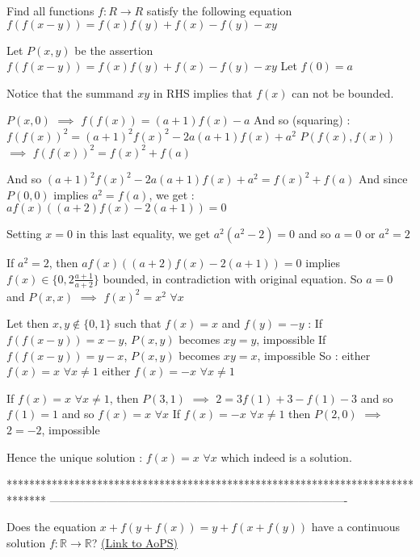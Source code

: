 \begin{solution}
	\begin{tcolorbox}Find all functions $f:R \to R$ satisfy the following equation
$f(f(x - y)) = f(x)f(y) + f(x) - f(y) - xy$\end{tcolorbox}
Let $P(x,y)$ be the assertion $f(f(x-y))=f(x)f(y)+f(x)-f(y)-xy$
Let $f(0)=a$

Notice that the summand $xy$ in RHS implies that $f(x)$ can not be bounded.

$P(x,0)$ $\implies$ $f(f(x))=(a+1)f(x)-a$
And so (squaring) : $f(f(x))^2=(a+1)^2f(x)^2-2a(a+1)f(x)+a^2$
$P(f(x),f(x))$ $\implies$ $f(f(x))^2=f(x)^2+f(a)$

And so $(a+1)^2f(x)^2-2a(a+1)f(x)+a^2=f(x)^2+f(a)$
And since $P(0,0)$ implies $a^2=f(a)$, we get : $af(x)((a+2)f(x)-2(a+1))=0$

Setting $x=0$ in this last equality, we get $a^2(a^2-2)=0$ and so $a=0$ or $a^2=2$

If $a^2=2$, then $af(x)((a+2)f(x)-2(a+1))=0$ implies $f(x)\in\{0,2\frac {a+1}{a+2}\}$ bounded, in contradiction with original equation.
So $a=0$ and $P(x,x)$ $\implies$ $f(x)^2=x^2$ $\forall x$

Let then $x,y\notin\{0,1\}$ such that $f(x)=x$ and $f(y)=-y$ :
If $f(f(x-y))=x-y$, $P(x,y)$ becomes $xy=y$, impossible
If $f(f(x-y))=y-x$, $P(x,y)$ becomes $xy=x$, impossible
So :
either $f(x)=x$ $\forall x\ne 1$
either $f(x)=-x$ $\forall x\ne 1$

If $f(x)=x$ $\forall x\ne 1$, then $P(3,1)$ $\implies$ $2=3f(1)+3-f(1)-3$ and so $f(1)=1$ and so $f(x)=x$ $\forall x$
If $f(x)=-x$ $\forall x\ne 1$ then $P(2,0)$ $\implies$ $2=-2$, impossible

Hence the unique solution : $\boxed{f(x)=x}$ $\forall x$ which indeed is a solution.
\end{solution}
*******************************************************************************
-------------------------------------------------------------------------------

\begin{problem}
	Does the equation
$x+f\left(y+f(x)\right)=y+f\left(x+f(y)\right)$
have a continuous solution $f:\mathbb{R}\rightarrow\mathbb{R}$?
	\flushright \href{https://artofproblemsolving.com/community/c6h414783}{(Link to AoPS)}
\end{problem}



